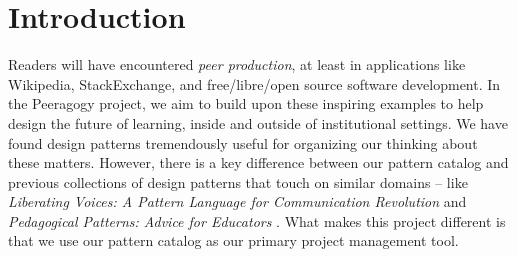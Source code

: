 
\section{Introduction}\label{sec:Introduction}

Readers will have encountered \emph{peer production}, at least in applications like Wikipedia, StackExchange, and free/libre/open source software development.   In the Peeragogy project,  we aim to build upon these inspiring examples to help design the future of learning, inside and outside of institutional settings.  
We have found design patterns tremendously useful for organizing our thinking about these matters.  However, there is a key difference between our pattern catalog and previous collections of design patterns that touch on similar domains -- like \emph{Liberating Voices: A Pattern Language for Communication Revolution} \cite{schuler2008liberating} and \emph{Pedagogical Patterns: Advice for Educators} \cite{bergin2012pedagogical}.  What makes this project different is that we use our pattern catalog as our primary project management tool.

